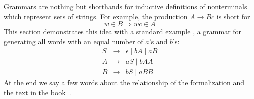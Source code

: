 %
\begin{isabellebody}%
\def\isabellecontext{AB}%
%
%
\begin{isamarkuptext}%
\label{sec:CFG}
Grammars are nothing but shorthands for inductive definitions of nonterminals
which represent sets of strings. For example, the production
$A \to B c$ is short for
\[ w \in B \Longrightarrow wc \in A \]
This section demonstrates this idea with a standard example
\cite[p.\ 81]{HopcroftUllman}, a grammar for generating all words with an
equal number of $a$'s and $b$'s:
\begin{eqnarray}
S &\to& \epsilon \mid b A \mid a B \nonumber\\
A &\to& a S \mid b A A \nonumber\\
B &\to& b S \mid a B B \nonumber
\end{eqnarray}
At the end we say a few words about the relationship of the formalization
and the text in the book~\cite[p.\ 81]{HopcroftUllman}.


\end{isamarkuptext}
\end{isabellebody}
